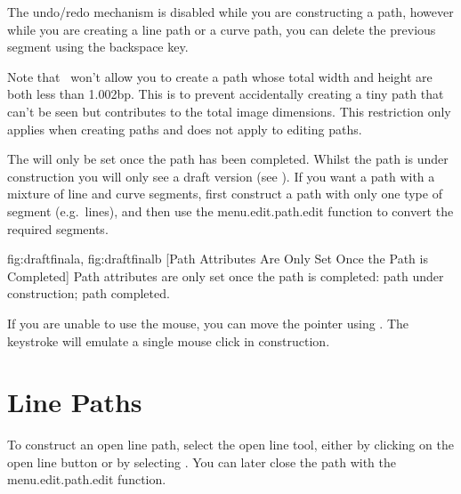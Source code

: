 \begin{warning}
The undo/redo mechanism is disabled while you are constructing a
path, however while you are creating a line path or a curve path,
you can delete the previous segment using the
backspace  key.
\end{warning}

Note that \FlowframTk\ won't allow you to create a \gls{path} whose
total width and height are both less than 1.002\gls{bp}. This is to
prevent accidentally creating a tiny path that can't be seen but
contributes to the total image dimensions. This restriction only
applies when creating \glspl*{path} and does not apply to editing
paths.

The  will only be set
once the \gls{path} has been completed. Whilst the
\gls{path} is under construction you will
only see a draft version (see ).
If you want a \gls{path} with a mixture of line and curve
segments, first construct a \gls{path} with only one
type of segment (e.g.\ lines), and then use the
\gls{menu.edit.path.edit} function to convert
the required segments.

{
 {fig:draftfinala}{}{},
 {fig:draftfinalb}{}{}
}
[Path Attributes Are Only Set Once the Path is Completed]
{Path attributes are only set once the path is completed:
 path under construction;
 path completed.}

If you are unable to use the mouse, you can move the pointer using
. The keystroke
 will emulate a single mouse
click in \gls{construction}.


\section{Line Paths}\label{sec:newlinepath}


To construct an open line \gls{path}, select the open line tool,
either by clicking on the open line button or by selecting
. You can later close the \gls{path}
with the \gls{menu.edit.path.edit} function.


